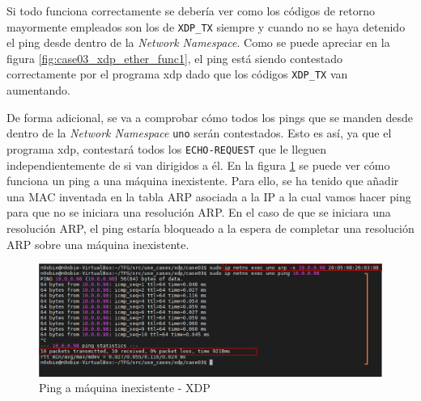 Si todo funciona correctamente se debería ver como los códigos de retorno mayormente empleados son los de \texttt{XDP\_TX} siempre y cuando no se haya detenido el ping  desde dentro de la \textit{Network Namespace}. Como se puede apreciar en la figura \ref{fig:case03_xdp_ether_func1}, el ping \hspace{1mm} está siendo contestado correctamente por el programa \gls{xdp} dado que los códigos \texttt{XDP\_TX} van aumentando.\\
\par
De forma adicional, se va a comprobar cómo todos los pings que se manden desde dentro de la \textit{Network Namespace} \texttt{uno} serán contestados. Esto es así, ya que el programa \gls{xdp}, contestará todos los \texttt{ECHO-REQUEST} que le lleguen independientemente de si van dirigidos a él. En la figura \ref{fig:case03_xdp_ether_func2} se puede ver cómo funciona un ping \hspace{1mm} a una máquina inexistente. Para ello, se ha tenido que añadir una MAC inventada en la tabla ARP asociada a la IP a la cual vamos hacer ping  para que no se iniciara una resolución ARP. En el caso de que se iniciara una resolución ARP, el ping estaría bloqueado a la espera de completar una resolución ARP sobre una máquina inexistente. 

\begin{figure}[h]
    \centering
    \includegraphics[width=14cm]{archivos/img/dev/xdp/case03/demo_case03_4_edited.png}
    \caption{Ping a máquina inexistente - XDP}
    \label{fig:case03_xdp_ether_func2}
\end{figure}
